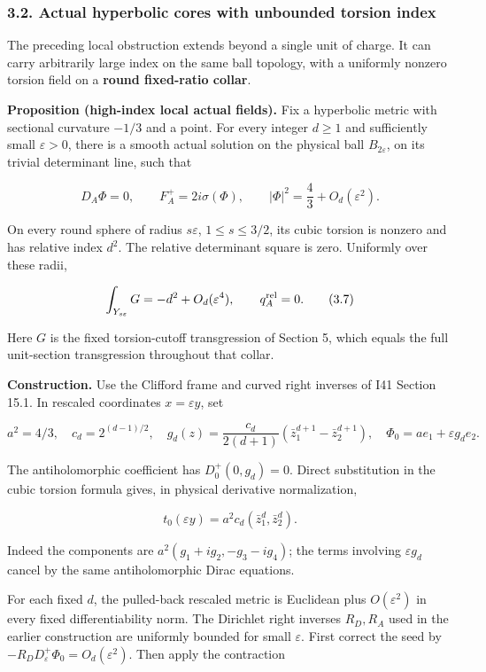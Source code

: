 \documentclass[
  11pt,
]{article}
\begin{document}
\hypertarget{actual-hyperbolic-cores-with-unbounded-torsion-index}{%
\subsubsection{3.2. Actual hyperbolic cores with unbounded torsion
index}\label{actual-hyperbolic-cores-with-unbounded-torsion-index}}

The preceding local obstruction extends beyond a single unit of charge.
It can carry arbitrarily large index on the same ball topology, with a
uniformly nonzero torsion field on a \textbf{round fixed-ratio collar}.

\textbf{Proposition (high-index local actual fields).} Fix a hyperbolic
metric with sectional curvature \(-1/3\) and a point. For every integer
\(d\ge1\) and sufficiently small \(\varepsilon>0\), there is a smooth
actual solution on the physical ball \(B_{2\varepsilon}\), on its
trivial determinant line, such that

\[
 D_A\Phi=0,\qquad F_A^+=2i\sigma(\Phi),\qquad
 |\Phi|^2=\frac43+O_d(\varepsilon^2).
 \tag{3.6}
\]

On every round sphere of radius \(s\varepsilon\), \(1\le s\le3/2\), its
cubic torsion is nonzero and has relative index \(d^2\). The relative
determinant square is zero. Uniformly over these radii,

\[
 \int_{Y_{s\varepsilon}}G=-d^2+O_d(\varepsilon^4),
 \qquad q_A^{\rm rel}=0.
 \tag{3.7}
\]

Here \(G\) is the fixed torsion-cutoff transgression of Section 5, which
equals the full unit-section transgression throughout that collar.

\textbf{Construction.} Use the Clifford frame and curved right inverses
of I41 Section 15.1. In rescaled coordinates \(x=\varepsilon y\), set

\[
 a^2=4/3,\quad c_d=2^{(d-1)/2},\quad
 g_d(z)=\frac{c_d}{2(d+1)}
              (\bar z_1^{d+1}-\bar z_2^{d+1}),\quad
 \Phi_0=a e_1+\varepsilon g_d e_2.
 \tag{3.8}
\]

The antiholomorphic coefficient has \(D_0^+(0,g_d)=0\). Direct
substitution in the cubic torsion formula gives, in physical derivative
normalization,

\[
 t_0(\varepsilon y)=a^2c_d(\bar z_1^d,\bar z_2^d).
 \tag{3.9}
\]

Indeed the components are \(a^2(g_1+ig_2,-g_3-ig_4)\); the terms
involving \(\varepsilon g_d\) cancel by the same antiholomorphic Dirac
equations.

For each fixed \(d\), the pulled-back rescaled metric is Euclidean plus
\(O(\varepsilon^2)\) in every fixed differentiability norm. The
Dirichlet right inverses \(R_D,R_A\) used in the earlier construction
are uniformly bounded for small \(\varepsilon\). First correct the seed
by \(-R_DD_\varepsilon^+\Phi_0=O_d(\varepsilon^2)\). Then apply the
contraction
\end{document}
